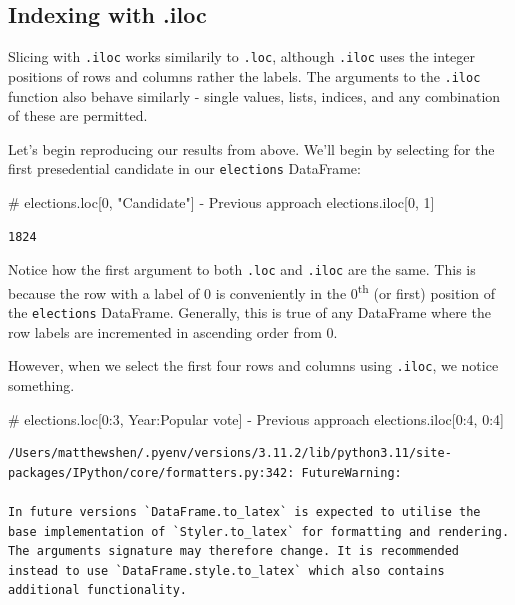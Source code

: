 \documentclass[
  letterpaper,
  DIV=11,
  numbers=noendperiod]{scrreprt}
\newenvironment{Shaded}{\begin{snugshade}}{\end{snugshade}}
\newcommand{\CommentTok}[1]{\textcolor[rgb]{0.37,0.37,0.37}{#1}}
\newcommand{\DecValTok}[1]{\textcolor[rgb]{0.68,0.00,0.00}{#1}}
\newcommand{\NormalTok}[1]{\textcolor[rgb]{0.00,0.23,0.31}{#1}}
\begin{document}
\hypertarget{indexing-with-.iloc}{%
\subsection{Indexing with .iloc}\label{indexing-with-.iloc}}

Slicing with \texttt{.iloc} works similarily to \texttt{.loc}, although
\texttt{.iloc} uses the integer positions of rows and columns rather the
labels. The arguments to the \texttt{.iloc} function also behave
similarly - single values, lists, indices, and any combination of these
are permitted.

Let's begin reproducing our results from above. We'll begin by selecting
for the first presedential candidate in our \texttt{elections}
DataFrame:

\begin{Shaded}
\begin{Highlighting}[]
\CommentTok{\# elections.loc[0, "Candidate"] {-} Previous approach}
\NormalTok{elections.iloc[}\DecValTok{0}\NormalTok{, }\DecValTok{1}\NormalTok{]}
\end{Highlighting}
\end{Shaded}

\begin{verbatim}
1824
\end{verbatim}

Notice how the first argument to both \texttt{.loc} and \texttt{.iloc}
are the same. This is because the row with a label of 0 is conveniently
in the 0\textsuperscript{th} (or first) position of the
\texttt{elections} DataFrame. Generally, this is true of any DataFrame
where the row labels are incremented in ascending order from 0.

However, when we select the first four rows and columns using
\texttt{.iloc}, we notice something.

\begin{Shaded}
\begin{Highlighting}[]
\CommentTok{\# elections.loc[0:3, \textquotesingle{}Year\textquotesingle{}:\textquotesingle{}Popular vote\textquotesingle{}] {-} Previous approach}
\NormalTok{elections.iloc[}\DecValTok{0}\NormalTok{:}\DecValTok{4}\NormalTok{, }\DecValTok{0}\NormalTok{:}\DecValTok{4}\NormalTok{]}
\end{Highlighting}
\end{Shaded}

\begin{verbatim}
/Users/matthewshen/.pyenv/versions/3.11.2/lib/python3.11/site-packages/IPython/core/formatters.py:342: FutureWarning:

In future versions `DataFrame.to_latex` is expected to utilise the base implementation of `Styler.to_latex` for formatting and rendering. The arguments signature may therefore change. It is recommended instead to use `DataFrame.style.to_latex` which also contains additional functionality.
\end{verbatim}
\end{document}
